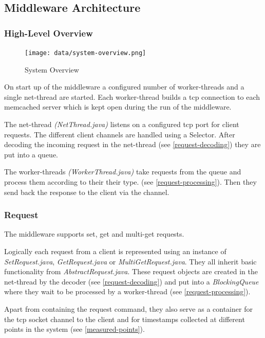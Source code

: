 \documentclass[11pt,a4paper]{article}
\begin{document}
\subsection{Middleware Architecture}
\subsubsection{High-Level Overview}

\begin{figure}
	\centering
	\texttt{[image: data/system-overview.png]}
	\caption{System Overview}
\end{figure}

On start up of the middleware a configured number of worker-threads and a single net-thread are started.
Each worker-thread builds a tcp connection to each memcached server which is kept open during the run of the middleware.


The net-thread \emph{(NetThread.java)} listens on a configured tcp port for client requests. The different client channels are handled using a Selector.
After decoding the incoming request in the net-thread (see \ref{request-decoding}) they are put into a queue.

The worker-threads \emph{(WorkerThread.java)} take requests from the queue and process them according to their their type. (see \ref{request-processing}). Then they send back the response to the client via the channel.

\subsubsection{Request}
The middleware supports set, get and multi-get requests.

Logically each request from a client is represented using an instance of \emph{SetRequest.java}, \emph{GetRequest.java} or \emph{MultiGetRequest.java}. They all inherit basic functionality from \emph{AbstractRequest.java}.
These request objects are created in the net-thread by the decoder (see \ref{request-decoding}) and put into a \emph{BlockingQueue} where they wait to be processed by a worker-thread (see \ref{request-processing}).

Apart from containing the request command, they also serve as a container for the tcp socket channel to the client and for timestamps collected at different points in the system (see \ref{measured-points}).
\end{document}
